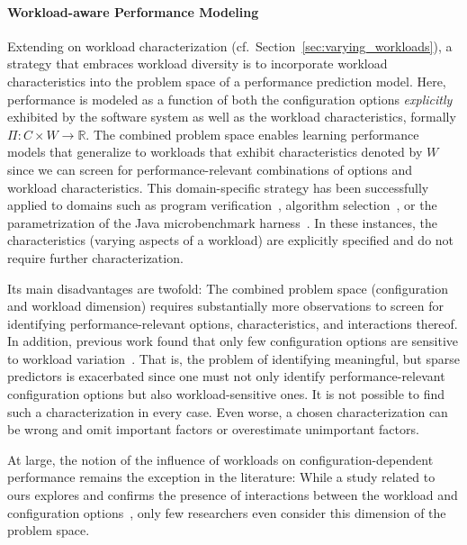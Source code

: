 {\paragraph{Workload-aware Performance Modeling}
\label{sec:workload-aware}
Extending on workload characterization (cf.~Section~\ref{sec:varying_workloads}), a strategy that embraces workload diversity is to incorporate workload characteristics into the problem space of a performance prediction model. Here, performance is modeled as a function of both the configuration options \textit{explicitly} exhibited by the software system as well as the workload characteristics, formally $\Pi: C \times W \rightarrow \mathbb{R}$.
The combined problem space enables learning performance models that generalize to workloads that exhibit characteristics denoted by $W$ since we can screen for performance-relevant combinations of options and workload characteristics. {This domain-specific strategy has been successfully applied to domains such as program verification~\cite{koc_satune_2021}, algorithm selection~\cite{kotthoff_algorithm_selection_2016}, or the parametrization of the Java microbenchmark harness~\cite{samoaa_workload_2021}. In these instances, the characteristics (varying aspects of a workload) are explicitly specified and do not require further characterization.}

Its main disadvantages are twofold: The combined problem space (configuration and workload dimension) requires substantially more observations to screen for identifying performance-relevant options, characteristics, and interactions thereof. In addition, previous work  found that  only few configuration options are sensitive to workload variation~\cite{jamishidi_transfer_2017}. That is, the problem of identifying meaningful, but sparse predictors is exacerbated since one must not only identify performance-relevant configuration options but also workload-sensitive ones. It is not possible to find such a characterization in every case. Even worse, a chosen characterization can be wrong and omit important factors or overestimate unimportant factors.
 
 {At large, the notion of the influence of workloads on configuration-dependent performance remains the exception in the literature: While a study related to ours explores and confirms the presence of interactions between the workload and configuration options~\cite{lesoil_2021}, only few researchers even consider this dimension of the problem space. }


}
